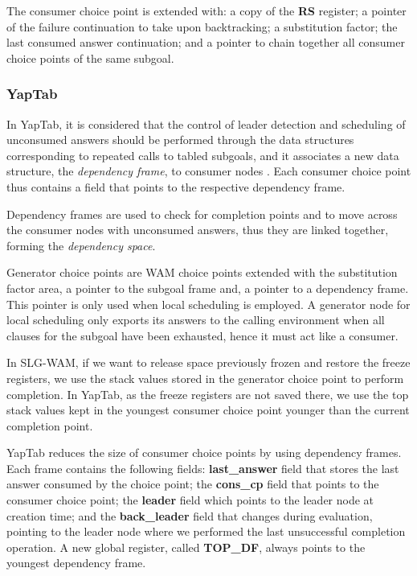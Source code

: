   The consumer choice point is extended with: a copy of the \textbf{RS} register; a pointer of the failure continuation to take
  upon backtracking; a substitution factor; the last consumed answer continuation; and a pointer to chain
  together all consumer choice points of the same subgoal. 

  \subsubsection{YapTab}

  In YapTab, it is considered that the control of leader detection and scheduling of unconsumed answers should be
  performed through the data structures corresponding to repeated calls to tabled subgoals, and it associates a new
  data structure, the \textit{dependency frame}, to consumer nodes \cite{Rocha-00a}. Each consumer choice point thus
  contains a field that points to the respective dependency frame.

  Dependency frames are used to check for completion points and to move across the consumer nodes with unconsumed answers,
  thus they are linked together, forming the \textit{dependency space}.

  Generator choice points are WAM choice points extended with the substitution factor area, a pointer
  to the subgoal frame and, a pointer to a dependency frame. This pointer
  is only used when local scheduling is employed. A generator node for local scheduling only exports its answers to the calling
  environment when all clauses for the subgoal have been exhausted, hence it must act like a consumer.

  In SLG-WAM, if we want to release space previously frozen and restore the freeze registers, we use the
  stack values stored in the generator choice point to perform completion. In YapTab, as the freeze registers
  are not saved there, we use the top stack values kept in the youngest consumer choice point younger than the current completion point.

  YapTab reduces the size of consumer choice points by using dependency frames. Each frame contains the
  following fields: \textbf{last\_answer} field that stores the last answer consumed by the choice point;
  the \textbf{cons\_cp} field that points to the consumer choice point; the \textbf{leader} field which
  points to the leader node at creation time; and the \textbf{back\_leader} field that changes during
  evaluation, pointing to the leader node where we performed the last unsuccessful completion operation.
  A new global register, called \textbf{TOP\_DF}, always points to the youngest dependency frame.

